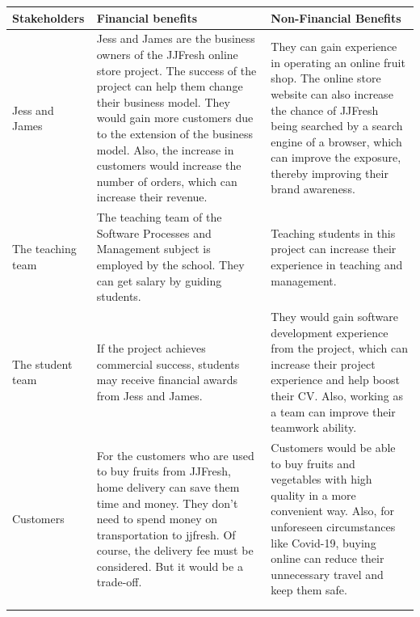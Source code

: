 \documentclass{report}
\begin{document}
\begin{tabularx}{0.95\linewidth}{%
  >{\raggedright\arraybackslash}l%
  >{\raggedright\arraybackslash}X%
  >{\raggedright\arraybackslash}X}
  \toprule
  Stakeholders & Financial benefits & Non-Financial Benefits \\
  \midrule
  Jess and James
  & Jess and James are the business owners of the JJFresh online store project. The success of the project can help them change their business model. They would gain more customers due to the extension of the business model. Also, the increase in customers would increase the number of orders, which can increase their revenue.
  & They can gain experience in operating an online fruit shop. The online store website can also increase the chance of JJFresh being searched by a search engine of a browser, which can improve the exposure, thereby improving their brand awareness. 
  \\
  \midrule
  The teaching team
  & The teaching team of the Software Processes and Management subject is employed by the school. They can get salary by guiding students.
  & Teaching students in this project can increase their experience in teaching and management.
  \\
  \midrule
  The student team
  & If the project achieves commercial success, students may receive financial awards from Jess and James.
  & They would gain software development experience from the project, which can increase their project experience and help boost their CV. Also, working as a team can improve their teamwork ability.
  \\
  \midrule
  Customers
  & For the customers who are used to buy fruits from JJFresh, home delivery can save them time and money. They don't need to spend money on transportation to jjfresh. Of course, the delivery fee must be considered. But it would be a trade-off.
  & Customers would be able to buy fruits and vegetables with high quality in a more convenient way. Also, for unforeseen circumstances like Covid-19, buying online can reduce their unnecessary travel and keep them safe.
  \\
  \bottomrule
  \\
  \caption{Business Value}  
  \label{tab:businessValue}
\end{tabularx}
\end{document}
